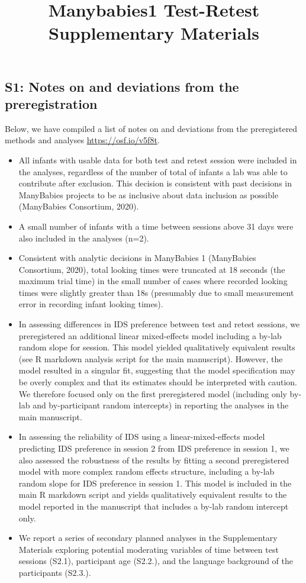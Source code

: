 \documentclass[
  man, donotrepeattitle,floatsintext]{apa6}
\title{Manybabies1 Test-Retest Supplementary Materials}
\author{\phantom{0}}
\date{}
\affiliation{\phantom{0}}
\providecommand{\tightlist}{%
  \setlength{\itemsep}{0pt}\setlength{\parskip}{0pt}}
\begin{document}
\maketitle

\hypertarget{s1-notes-on-and-deviations-from-the-preregistration}{%
\subsection{S1: Notes on and deviations from the preregistration}\label{s1-notes-on-and-deviations-from-the-preregistration}}

Below, we have compiled a list of notes on and deviations from the preregistered methods and analyses \url{https://osf.io/v5f8t}.

\begin{itemize}
\tightlist
\item
  All infants with usable data for both test and retest session were included in the analyses, regardless of the number of total of infants a lab was able to contribute after exclusion. This decision is consistent with past decisions in ManyBabies projects to be as inclusive about data inclusion as possible (ManyBabies Consortium, 2020).
\item
  A small number of infants with a time between sessions above 31 days were also included in the analyses (n=2).
\item
  Consistent with analytic decisions in ManyBabies 1 (ManyBabies Consortium, 2020), total looking times were truncated at 18 seconds (the maximum trial time) in the small number of cases where recorded looking times were slightly greater than 18s (presumably due to small measurement error in recording infant looking times).
\item
  In assessing differences in IDS preference between test and retest sessions, we preregistered an additional linear mixed-effects model including a by-lab random slope for session. This model yielded qualitatively equivalent results (see R markdown analysis script for the main manuscript). However, the model resulted in a singular fit, suggesting that the model specification may be overly complex and that its estimates should be interpreted with caution. We therefore focused only on the first preregistered model (including only by-lab and by-participant random intercepts) in reporting the analyses in the main manuscript.
\item
  In assessing the reliability of IDS using a linear-mixed-effects model predicting IDS preference in session 2 from IDS preference in session 1, we also assessed the robustness of the results by fitting a second preregistered model with more complex random effects structure, including a by-lab random slope for IDS preference in session 1. This model is included in the main R markdown script and yields qualitatively equivalent results to the model reported in the manuscript that includes a by-lab random intercept only.
\item
  We report a series of secondary planned analyses in the Supplementary Materials exploring potential moderating variables of time between test sessions (S2.1), participant age (S2.2.), and the language background of the participants (S2.3.).
\end{itemize}
\end{document}
